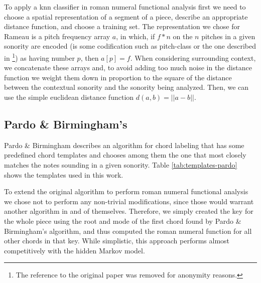 To apply a knn classifier in roman numeral functional analysis first
we need to choose a spatial representation of a segment of a piece,
describe an appropriate distance function, and choose a training
set. The representation we chose for Rameau is a pitch frequency array
$a$, in which, if $f*n$ on the $n$ pitches in a given sonority are
encoded (is some codification such as pitch-class or the one described
in \footnote{The reference to the original paper was removed for
  anonymity reasons.}) as having number $p$, then $a[p] = f$. When
considering surrounding context, we concatenate these arrays and, to
avoid adding too much noise in the distance function we weight them
down in proportion to the square of the distance between the
contextual sonority and the sonority being analyzed. Then, we can use
the simple euclidean distance function $d(a,b) = ||a-b||$.

\subsection{Pardo \& Birmingham's}
\label{sec:pardo--birminghams}

Pardo \& Birmingham \cite{pardo.ea99:automated} describes an algorithm
for chord labeling that has some predefined chord templates and
chooses among them the one that most closely matches the notes
sounding in a given sonority. Table \ref{tab:templates-pardo} shows
the templates used in this work.

To extend the original algorithm to perform roman numeral functional
analysis we chose not to perform any non-trivial modifications, since
those would warrant another algorithm in and of themselves. Therefore,
we simply created the key for the whole piece using the root and mode
of the first chord found by Pardo \& Birmingham's algorithm, and
thus computed the roman numeral function for all other chords in that
key. While simplistic, this approach performs almost competitively
with the hidden Markov model.

